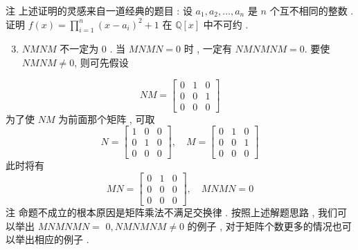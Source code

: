\documentclass[10pt]{article}
\begin{document}
 注   上述证明的灵感来自一道经典的题目 :  设  $a_{1}, a_{2}, \ldots, a_{n}$  是  $n$  个互不相同的整数 .  证明  $f(x)=\prod_{i=1}^{n}\left(x-a_{i}\right)^{2}+1$  在  $\mathbb{Q}[x]$  中不可约 .

\begin{enumerate}
  \setcounter{enumi}{2}
  \item $N M N M$  不一定为  0 .  当  $M N M N=0$  时 ,  一定有  $N M N M N M=0$.  要使  $N M N M \neq 0$,  则可先假设 
\end{enumerate}
$$
N M=\left[\begin{array}{lll}
0 & 1 & 0 \\
0 & 0 & 1 \\
0 & 0 & 0
\end{array}\right]
$$
 为了使  $N M$  为前面那个矩阵 ,  可取 
$$
N=\left[\begin{array}{lll}
1 & 0 & 0 \\
0 & 1 & 0 \\
0 & 0 & 0
\end{array}\right], \quad M=\left[\begin{array}{lll}
0 & 1 & 0 \\
0 & 0 & 1 \\
0 & 0 & 0
\end{array}\right]
$$
 此时将有 
$$
M N=\left[\begin{array}{lll}
0 & 1 & 0 \\
0 & 0 & 0 \\
0 & 0 & 0
\end{array}\right], \quad M N M N=0
$$
 注   命题不成立的根本原因是矩阵乘法不满足交换律 .  按照上述解题思路 ,  我们可以举出  $M N M N M N=$ $0, N M N M N M \neq 0$  的例子 ,  对于矩阵个数更多的情况也可以举出相应的例子 .
\end{document}
